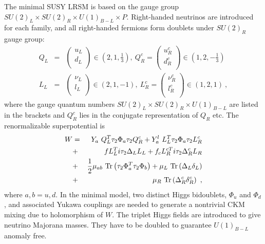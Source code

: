 \documentclass[prd,aps,preprint,tightenlines,superscriptaddress]{revtex4}
\begin{document}
The minimal SUSY LRSM is based on the gauge group $SU(2)_L \times
SU(2)_R \times U(1)_{B-L} \times P$. Right-handed neutrinos are introduced for each
family, and all right-handed fermions form doublets under $SU(2)_R$ gauge group:
\begin{eqnarray}
Q_L &=& \left( \begin{array}{c} u_L \\ d_L \\ \end{array} \right) \in \left(2, 1,
\frac{1}{3}\right), \ Q_R^c = \left(
\begin{array}{c} u_R^c
\\ d_R^c \\ \end{array} \right) \in \left(1, 2,
-\frac{1}{3}\right) \nonumber\\
L_L &=& \left( \begin{array}{c} \nu_L \\
l_L \\ \end{array} \right) \in \left(2, 1, -1\right), \ L_R^c = \left(
\begin{array}{c} \nu_R^c
\\ l_R^c \\ \end{array} \right) \in \left(1, 2, 1\right) \ ,
\end{eqnarray}
where the gauge quantum numbers $SU(2)_L \times SU(2)_R \times U(1)_{B-L}$ are listed in
the brackets and $Q_R^c$ lies in the conjugate representation of $Q_R$ etc. The
renormalizable superpotential is
\begin{eqnarray}\label{super}
W &=& Y_a ~Q_L^T \tau_2 \Phi_a \tau_2 Q_R^c + Y_a^l~ L_L^T \tau_2 \Phi_a
\tau_2 L_R^c \nonumber \\
&+& f L_L^T i \tau_2 \Delta_L L_L + f_c L_R^{cT} i \tau_2 \Delta_R^c L_R \nonumber \\
&+& \frac{1}{2} \mu_{ab}{~\rm Tr}\left( \tau_2 \Phi_a^T \tau_2 \Phi_b \right)
+\mu_L{~\rm Tr}\left( \Delta_L \delta_L \right) \nonumber \\
&+& \mu_R{~\rm Tr}\left( \Delta_R^c \delta_R^c \right)\ ,
 \end{eqnarray}
where $a,b=u,d$. In the minimal model, two distinct Higgs bidoublets, $\Phi_u$ and
$\Phi_d$, and associated Yukawa couplings are needed to generate a nontrivial CKM mixing due to holomorphism of $W$.
The triplet Higgs fields are introduced to give neutrino Majorana masses.
They have to be doubled to guarantee $U(1)_{B-L}$ anomaly free.
\end{document}
